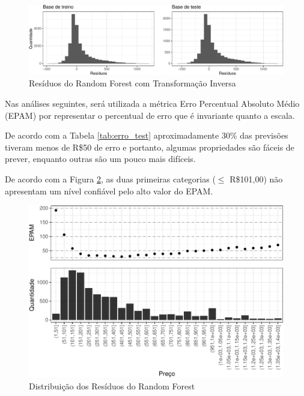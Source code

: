 \documentclass[
	12pt,				%
	a4paper,		%
	oneside,    %
	chapter=TITLE,		   %
	section=TITLE,		   %
	subsection=TITLE,	   %
	subsubsection=TITLE, %
	english,			%
	french,				%
	spanish,			%
	brazil,				%
]{abntex2}
\begin{document}
\begin{figure}
\centering
\includegraphics{00-TCC_files/figure-latex/resid_rf_inv-1.pdf}
\caption{\label{resid_rf_inv}Resíduos do Random Forest com Transformação
Inversa}
\end{figure}

Nas análises seguintes, será utilizada a métrica Erro Percentual
Absoluto Médio (EPAM) por representar o percentual de erro que é
invariante quanto a escala.

De acordo com a Tabela \ref{tab:erro_test} aproximadamente 30\% das
previsões tiveram menos de R\$50 de erro e portanto, algumas
propriedades são fáceis de prever, enquanto outras são um pouco mais
difíceis.

De acordo com a Figura \ref{graf_resid_rf}, as duas primeiras categorias
(\(\le\) R\$101,00) não apresentam um nível confiável pelo alto valor do
EPAM.

\begin{figure}
\centering
\includegraphics{00-TCC_files/figure-latex/graf_resid_rf-1.pdf}
\caption{\label{graf_resid_rf}Distribuição dos Resíduos do Random
Forest}
\end{figure}
\end{document}
